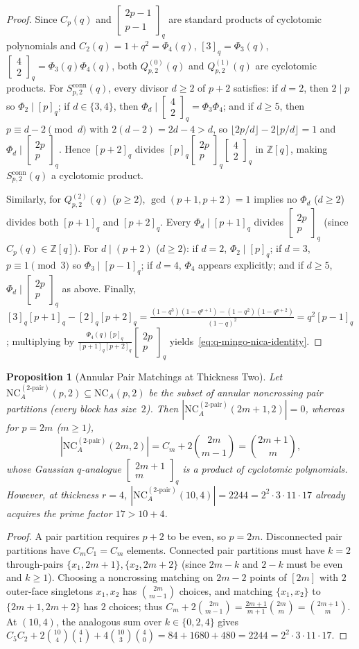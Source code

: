 \documentclass[11pt,a4paper]{article}
\newtheorem{proposition}[theorem]{Proposition}
\theoremstyle{definition}
\theoremstyle{remark}
\newcommand{\NCA}{\mathrm{NC}_A}
\newcommand{\qbinom}[2]{\begin{bmatrix} #1 \\ #2 \end{bmatrix}_q}
\begin{document}
\begin{proof}
Since $C_p(q)$ and $\qbinom{2p-1}{p-1}$ are standard products of cyclotomic polynomials and $C_2(q) = 1 + q^2 = \Phi_4(q)$, $[3]_q = \Phi_3(q)$, $\qbinom{4}{2} = \Phi_3(q)\Phi_4(q)$, both $Q^{(0)}_{p,2}(q)$ and $Q^{(1)}_{p,2}(q)$ are cyclotomic products. For $S^{\mathrm{conn}}_{p,2}(q)$, every divisor $d \ge 2$ of $p + 2$ satisfies: if $d = 2$, then $2 \mid p$ so $\Phi_2 \mid [p]_q$; if $d \in \{3,4\}$, then $\Phi_d \mid \qbinom{4}{2} = \Phi_3\Phi_4$; and if $d \ge 5$, then $p \equiv d - 2 \pmod{d}$ with $2(d-2) = 2d - 4 > d$, so $\lfloor 2p/d \rfloor - 2\lfloor p/d \rfloor = 1$ and $\Phi_d \mid \qbinom{2p}{p}$. Hence $[p+2]_q$ divides $[p]_q \qbinom{2p}{p}\qbinom{4}{2}$ in $\mathbb{Z}[q]$, making $S^{\mathrm{conn}}_{p,2}(q)$ a cyclotomic product.

Similarly, for $Q^{(2)}_{p,2}(q)$ ($p \ge 2$), $\gcd(p+1,p+2) = 1$ implies no $\Phi_d$ ($d \ge 2$) divides both $[p+1]_q$ and $[p+2]_q$. Every $\Phi_d \mid [p+1]_q$ divides $\qbinom{2p}{p}$ (since $C_p(q) \in \mathbb{Z}[q]$). For $d \mid (p+2)$ ($d \ge 2$): if $d = 2$, $\Phi_2 \mid [p]_q$; if $d = 3$, $p \equiv 1 \pmod 3$ so $\Phi_3 \mid [p-1]_q$; if $d = 4$, $\Phi_4$ appears explicitly; and if $d \ge 5$, $\Phi_d \mid \qbinom{2p}{p}$ as above. Finally, $[3]_q [p+1]_q - [2]_q [p+2]_q = \frac{(1-q^3)(1-q^{p+1}) - (1-q^2)(1-q^{p+2})}{(1-q)^2} = q^2 [p-1]_q$; multiplying by $\frac{\Phi_4(q)[p]_q}{[p+1]_q [p+2]_q}\qbinom{2p}{p}$ yields~\eqref{eq:q-mingo-nica-identity}.
\end{proof}

\begin{proposition}[Annular Pair Matchings at Thickness Two]\label{prop:pair-matchings}
Let $\NCA^{(2\text{-pair})}(p,2) \subseteq \NCA(p,2)$ be the subset of annular noncrossing \emph{pair partitions} (every block has size~$2$). Then $|\NCA^{(2\text{-pair})}(2m+1,2)| = 0$, whereas for $p = 2m$ ($m \ge 1$),
\[
  |\NCA^{(2\text{-pair})}(2m,2)| = C_m + 2\binom{2m}{m-1} = \binom{2m+1}{m},
\]
whose Gaussian $q$-analogue $\qbinom{2m+1}{m}$ is a product of cyclotomic polynomials. However, at thickness $r = 4$, $|\NCA^{(2\text{-pair})}(10,4)| = 2244 = 2^2 \cdot 3 \cdot 11 \cdot 17$ already acquires the prime factor $17 > 10 + 4$.
\end{proposition}

\begin{proof}
A pair partition requires $p + 2$ to be even, so $p = 2m$. Disconnected pair partitions have $C_m C_1 = C_m$ elements. Connected pair partitions must have $k = 2$ through-pairs $\{x_1, 2m+1\}, \{x_2, 2m+2\}$ (since $2m - k$ and $2 - k$ must be even and $k \ge 1$). Choosing a noncrossing matching on $2m - 2$ points of $[2m]$ with $2$ outer-face singletons $x_1, x_2$ has $\binom{2m}{m-1}$ choices, and matching $\{x_1,x_2\}$ to $\{2m+1,2m+2\}$ has $2$ choices; thus $C_m + 2\binom{2m}{m-1} = \frac{2m+1}{m+1}\binom{2m}{m} = \binom{2m+1}{m}$. At $(10,4)$, the analogous sum over $k \in \{0,2,4\}$ gives $C_5 C_2 + 2\binom{10}{4}\binom{4}{1} + 4\binom{10}{3}\binom{4}{0} = 84 + 1680 + 480 = 2244 = 2^2 \cdot 3 \cdot 11 \cdot 17$.
\end{proof}
\end{document}

